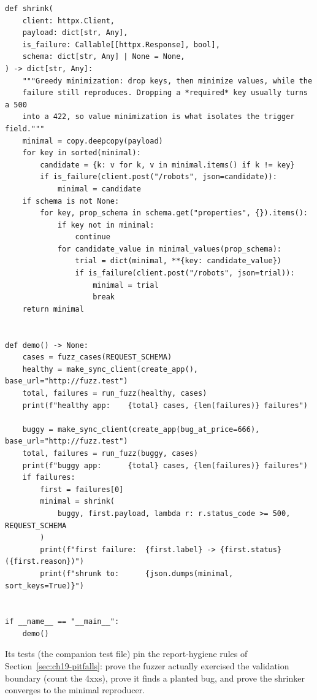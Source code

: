 \begin{verbatim}
def shrink(
    client: httpx.Client,
    payload: dict[str, Any],
    is_failure: Callable[[httpx.Response], bool],
    schema: dict[str, Any] | None = None,
) -> dict[str, Any]:
    """Greedy minimization: drop keys, then minimize values, while the
    failure still reproduces. Dropping a *required* key usually turns a 500
    into a 422, so value minimization is what isolates the trigger field."""
    minimal = copy.deepcopy(payload)
    for key in sorted(minimal):
        candidate = {k: v for k, v in minimal.items() if k != key}
        if is_failure(client.post("/robots", json=candidate)):
            minimal = candidate
    if schema is not None:
        for key, prop_schema in schema.get("properties", {}).items():
            if key not in minimal:
                continue
            for candidate_value in minimal_values(prop_schema):
                trial = dict(minimal, **{key: candidate_value})
                if is_failure(client.post("/robots", json=trial)):
                    minimal = trial
                    break
    return minimal


def demo() -> None:
    cases = fuzz_cases(REQUEST_SCHEMA)
    healthy = make_sync_client(create_app(), base_url="http://fuzz.test")
    total, failures = run_fuzz(healthy, cases)
    print(f"healthy app:    {total} cases, {len(failures)} failures")

    buggy = make_sync_client(create_app(bug_at_price=666), base_url="http://fuzz.test")
    total, failures = run_fuzz(buggy, cases)
    print(f"buggy app:      {total} cases, {len(failures)} failures")
    if failures:
        first = failures[0]
        minimal = shrink(
            buggy, first.payload, lambda r: r.status_code >= 500, REQUEST_SCHEMA
        )
        print(f"first failure:  {first.label} -> {first.status} ({first.reason})")
        print(f"shrunk to:      {json.dumps(minimal, sort_keys=True)}")


if __name__ == "__main__":
    demo()
\end{verbatim}

Its tests (the companion test file) pin the report-hygiene rules of
Section~\ref{sec:ch19-pitfalls}: prove the fuzzer actually exercised the
validation boundary (count the 4xxs), prove it finds a planted bug, and
prove the shrinker converges to the minimal reproducer.

